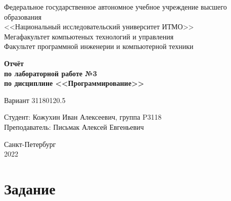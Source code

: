 \documentclass[12pt]{article}
\begin{document}
\setcounter{page}{0}
\thispagestyle{empty}

\begin{center}
    Федеральное государственное автономное учебное учреждение высшего образования\\
    <<Национальный исследовательский университет ИТМО>>\\
\vspace{0.5cm}
    Мегафакультет компьютеных технологий и управления\\
    Факультет программной инженерии и компьютерной техники
\end{center}

\vspace{3cm}

\begin{center}
\Large
\textbf{
    Отчёт\\
    по лабораторной работе №3\\
    по дисциплине <<Программирование>>
}
\end{center}

\begin{center}
\large
    Вариант 31180120.5
\end{center}

\vspace{6cm}

\begin{flushright}
    Студент: Кожухин Иван Алексеевич, группа P3118\\
    Преподаватель: Письмак Алексей Евгеньевич
\end{flushright}

\vspace{6cm}

\begin{center}
    Санкт-Петербург\\
    2022
\end{center}

\newpage

\tableofcontents

\newpage

\section{Задание}
\end{document}
